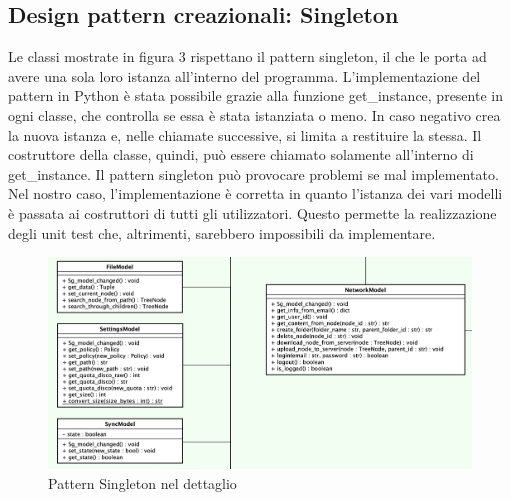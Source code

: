 \subsection{Design pattern creazionali: Singleton}

Le classi mostrate in figura 3 rispettano il pattern singleton, il che le porta ad avere una sola loro istanza all'interno del programma.
\newline{}
L'implementazione del pattern in Python è stata possibile grazie alla funzione get\_instance, presente in ogni classe,  che controlla se essa è stata istanziata o meno. In caso negativo crea la nuova istanza e, nelle chiamate successive, si limita a restituire la stessa. Il costruttore della classe, quindi, può essere chiamato solamente all'interno di get\_instance. \newline{}
Il pattern singleton può provocare problemi se mal implementato. Nel nostro caso, l'implementazione è corretta in quanto l'istanza dei vari modelli è passata ai costruttori di tutti gli utilizzatori. Questo permette la realizzazione degli unit test che, altrimenti, sarebbero impossibili da implementare. 
\begin{figure}[H]
    \centering
    \includegraphics[scale = 0.43]{components/img/singleton-model.png}
    \caption{Pattern Singleton nel dettaglio}
    \label{fig:Diagramma del pattern singleton}
\end{figure}
